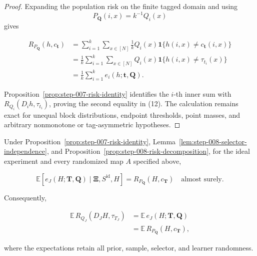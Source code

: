 \begin{proof}
Expanding the population risk on the finite tagged domain and using
\[
P_{\boldsymbol Q}(i,x)=k^{-1}Q_i(x)
\]
gives

\[
\begin{aligned}
R_{P_{\boldsymbol Q}}(h,c_{\boldsymbol t})
&=\sum_{i=1}^k\sum_{x\in[N]}
  \frac1k Q_i(x)
  \mathbf1\{h(i,x)\ne c_{\boldsymbol t}(i,x)\}\\
&=\frac1k\sum_{i=1}^k\sum_{x\in[N]}Q_i(x)
  \mathbf1\{h(i,x)\ne\tau_{t_i}(x)\}\\
&=\frac1k\sum_{i=1}^k e_i(h;\boldsymbol t,\boldsymbol Q).
\end{aligned}
\tag{13}
\]

Proposition~\ref{prop:step-007-risk-identity} identifies the
\(i\)-th inner sum with
\(R_{Q_i}(D_i h,\tau_{t_i})\), proving the second equality in (12). The
calculation remains exact for unequal block distributions, endpoint
thresholds, point masses, and arbitrary nonmonotone or tag-asymmetric
hypotheses. \end{proof}

\begin{proposition}\label{prop:step-008-selected-risk-identity}
Under Proposition~\ref{prop:step-007-risk-identity},
Lemma~\ref{lem:step-008-selector-independence}, and
Proposition~\ref{prop:step-008-risk-decomposition}, for the ideal experiment
and every randomized map \(A\) specified above,

\[
\mathbb E\!\left[
e_J(H;\boldsymbol T,\boldsymbol Q)
\mid\boldsymbol\Xi,S^{\mathrm{id}},H
\right]
=R_{P_{\boldsymbol Q}}(H,c_{\boldsymbol T})
\quad\text{almost surely}.
\tag{14}
\]

Consequently,

\[
\begin{aligned}
\mathbb E\,
R_{Q_J}(D_JH,\tau_{T_J})
&=\mathbb E\,e_J(H;\boldsymbol T,\boldsymbol Q)\\
&=\mathbb E\,R_{P_{\boldsymbol Q}}(H,c_{\boldsymbol T}),
\end{aligned}
\tag{15}
\]

where the expectations retain all prior, sample, selector, and learner
randomness.
\end{proposition}

